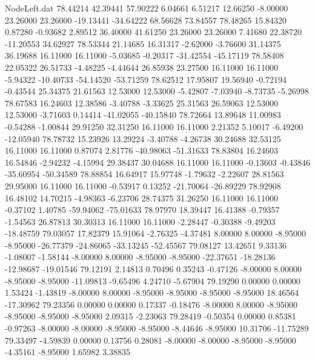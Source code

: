 \begin{filecontents}{NodeLeft.dat}
  78.44214   42.39441   57.90222     6.04661    6.51217   12.66250   -8.00000   23.26000   23.26000  -19.13441  -34.64222   68.56628   73.84557
  78.48265   15.84320    0.87280    -0.93682    2.89512   36.40000   41.61250   23.26000   23.26000    7.41680   22.38720  -11.20553   34.62927
  78.53344   21.14685   16.31317    -2.62000   -3.76600   31.14375   36.19688   16.11000   16.11000   -5.03685   -0.20317  -31.42554  -45.17119
  78.58408   22.05322   26.51733    -4.48225   -4.44644   26.85938   23.27500   16.11000   16.11000   -5.94322  -10.40733  -54.14520  -53.71259
  78.62512   17.95807   19.56940    -0.72194   -0.43544   25.34375   21.61563   12.53000   12.53000   -5.42807   -7.03940   -8.73735   -5.26998
  78.67583   16.24603   12.38586    -3.40788   -3.33625   25.31563   26.59063   12.53000   12.53000   -3.71603    0.14414  -41.02055  -40.15840
  78.72664   13.89648   11.00983    -0.54288   -1.00844   29.91250   32.31250   16.11000   16.11000    2.21352    5.10017   -6.49200  -12.05940
  78.78732   15.23926   13.29224    -3.40788   -4.26738   30.24688   32.53125   16.11000   16.11000    0.87074    2.81776  -40.98063  -51.31633
  78.83804   16.24603   16.54846    -2.94232   -4.15994   29.38437   30.04688   16.11000   16.11000   -0.13603   -0.43846  -35.60954  -50.34589
  78.88854   16.64917   15.97748    -1.79632   -2.22607   28.81563   29.95000   16.11000   16.11000   -0.53917    0.13252  -21.70064  -26.89229
  78.92908   16.48102   14.70215    -4.98363   -6.23706   28.74375   31.26250   16.11000   16.11000   -0.37102    1.40785  -59.94062  -75.01633
  78.97970   18.39447   16.41388    -0.79357   -1.54563   26.87813   30.30313   16.11000   16.11000   -2.28447   -0.30388   -9.49203  -18.48759
  79.03057   17.82379   15.91064    -2.76325   -4.37481    8.00000    8.00000   -8.95000   -8.95000  -26.77379  -24.86065  -33.13245  -52.45567
  79.08127   13.42651    9.33136    -1.08007   -1.58144   -8.00000    8.00000   -8.95000   -8.95000  -22.37651  -18.28136  -12.98687  -19.01546
  79.12191    2.14813    0.70496     0.35243   -0.47126   -8.00000    8.00000   -8.95000   -8.95000  -11.09813   -9.65496    4.24710   -5.67904
  79.19290    0.00000    0.00000     1.53424   -1.43819   -8.00000    8.00000   -8.95000   -8.95000   -8.95000   -8.95000   18.46564  -17.30962
  79.23356    0.00000    0.00000     0.17337   -0.18476   -8.00000    8.00000   -8.95000   -8.95000   -8.95000   -8.95000    2.09315   -2.23063
  79.28419   -0.50354    0.00000     0.85381   -0.97263   -8.00000   -8.00000   -8.95000   -8.95000   -8.44646   -8.95000   10.31706  -11.75289
  79.33497   -4.59839    0.00000     0.13756    0.28081   -8.00000   -8.00000   -8.95000   -8.95000   -4.35161   -8.95000    1.65982    3.38835

\end{filecontents}
